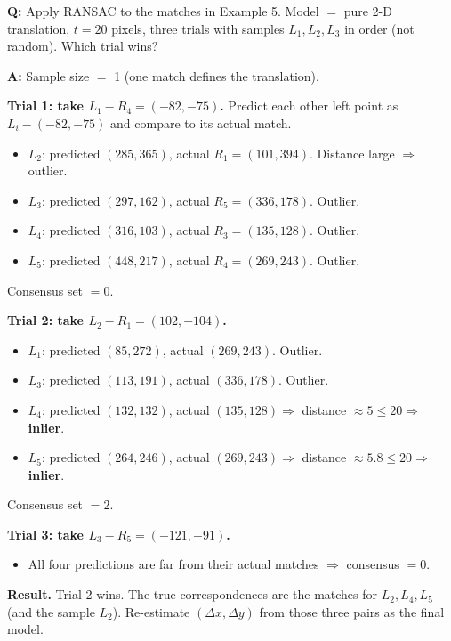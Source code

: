 \begin{exbox}
\textbf{Q:} Apply RANSAC to the matches in Example 5. Model $=$ pure 2-D translation, $t = 20$ pixels, three trials with samples $L_1, L_2, L_3$ in order (not random). Which trial wins?

\textbf{A:} Sample size $=$ 1 (one match defines the translation).

\textbf{Trial 1: take $L_1{-}R_4 = (-82, -75)$.} Predict each other left point as $L_i - (-82,-75)$ and compare to its actual match.
\begin{itemize}
  \item $L_2$: predicted $(285, 365)$, actual $R_1 = (101, 394)$. Distance large $\Rightarrow$ outlier.
  \item $L_3$: predicted $(297, 162)$, actual $R_5 = (336, 178)$. Outlier.
  \item $L_4$: predicted $(316, 103)$, actual $R_3 = (135, 128)$. Outlier.
  \item $L_5$: predicted $(448, 217)$, actual $R_4 = (269, 243)$. Outlier.
\end{itemize}
Consensus set $= 0$.

\textbf{Trial 2: take $L_2{-}R_1 = (102, -104)$.}
\begin{itemize}
  \item $L_1$: predicted $(85, 272)$, actual $(269, 243)$. Outlier.
  \item $L_3$: predicted $(113, 191)$, actual $(336, 178)$. Outlier.
  \item $L_4$: predicted $(132, 132)$, actual $(135, 128) \Rightarrow$ distance $\approx 5 \le 20 \Rightarrow$ \textbf{inlier}.
  \item $L_5$: predicted $(264, 246)$, actual $(269, 243) \Rightarrow$ distance $\approx 5.8 \le 20 \Rightarrow$ \textbf{inlier}.
\end{itemize}
Consensus set $= 2$.

\textbf{Trial 3: take $L_3{-}R_5 = (-121, -91)$.}
\begin{itemize}
  \item All four predictions are far from their actual matches $\Rightarrow$ consensus $= 0$.
\end{itemize}

\textbf{Result.} Trial 2 wins. The true correspondences are the matches for $L_2, L_4, L_5$ (and the sample $L_2$). Re-estimate $(\Delta x, \Delta y)$ from those three pairs as the final model.
\end{exbox}

